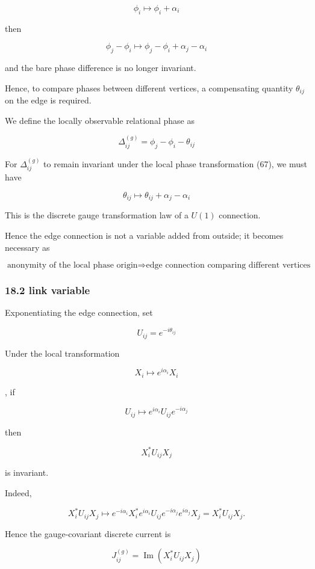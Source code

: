 \documentclass[
  a4paper,
]{article}
\begin{document}
\[
\boxed{
\phi_i\mapsto\phi_i+\alpha_i
}
\tag{67}
\]

then

\[
\phi_j-\phi_i
\mapsto
\phi_j-\phi_i+\alpha_j-\alpha_i
\]

and the bare phase difference is no longer invariant.

Hence, to compare phases between different vertices, a compensating
quantity \(\theta_{ij}\) on the edge is required.

We define the locally observable relational phase as

\[
\boxed{
\Delta_{ij}^{(g)}
=
\phi_j-\phi_i-\theta_{ij}
}
\tag{68}
\]

For \(\Delta_{ij}^{(g)}\) to remain invariant under the local phase
transformation (67), we must have

\[
\boxed{
\theta_{ij}
\mapsto
\theta_{ij}
+
\alpha_j-\alpha_i
}
\tag{69}
\]

This is the discrete gauge transformation law of a \(U(1)\) connection.

Hence the edge connection is not a variable added from outside; it
becomes necessary as

\[
\boxed{
\text{anonymity of the local phase origin}
\Longrightarrow
\text{edge connection comparing different vertices}
}
\tag{70}
\]

\subsubsection{18.2 link variable}\label{link-variable}

Exponentiating the edge connection, set

\[
\boxed{
U_{ij}
=
e^{-i\theta_{ij}}
}
\tag{71}
\]

Under the local transformation

\[
X_i
\mapsto
e^{i\alpha_i}X_i
\]

, if

\[
U_{ij}
\mapsto
e^{i\alpha_i}
U_{ij}
e^{-i\alpha_j}
\]

then

\[
X_i^*U_{ij}X_j
\]

is invariant.

Indeed,

\[
X_i^*U_{ij}X_j
\mapsto
e^{-i\alpha_i}X_i^*
e^{i\alpha_i}U_{ij}e^{-i\alpha_j}
e^{i\alpha_j}X_j
=
X_i^*U_{ij}X_j.
\]

Hence the gauge-covariant discrete current is

\[
\boxed{
J_{ij}^{(g)}
=
\operatorname{Im}
\left(
X_i^*U_{ij}X_j
\right)
}
\tag{72}
\]
\end{document}
